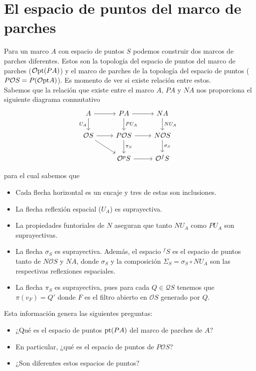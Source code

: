 \section{El espacio de puntos del marco de parches}

Para un marco $A$ con espacio de puntos $S$ podemos construir dos marcos de parches diferentes. Estos son la topología del espacio de puntos del marco de parches ($\mathcal{O}\mathrm{pt}(PA)$) y el marco de parches de la topología del espacio de puntos ($P\mathcal{O}S=P(\mathcal{O}\mathrm{pt} A)$). Es momento de ver si existe relación entre estos.\\

Sabemos que la relación que existe entre el marco $A$, $PA$ y $NA$ nos proporciona el siguiente diagrama conmutativo
\[\begin{tikzcd}
	A & PA & NA \\
	{\mathcal{O}S} & {P\mathcal{O}S} & {N\mathcal{O}S} \\
	& {\mathcal{O}^pS} & {\mathcal{O}^fS}
	\arrow[from=1-1, to=1-2]
	\arrow["{U_A}"', from=1-1, to=2-1]
	\arrow[from=1-2, to=1-3]
	\arrow["{PU_A}", from=1-2, to=2-2]
	\arrow["{NU_A}", from=1-3, to=2-3]
	\arrow[from=2-1, to=2-2]
	\arrow[from=2-1, to=3-2]
	\arrow[from=2-2, to=2-3]
	\arrow["{\pi_S}", from=2-2, to=3-2]
	\arrow["{\sigma_S}", from=2-3, to=3-3]
	\arrow[from=3-2, to=3-3]
\end{tikzcd}\]

para el cual sabemos que
\begin{itemize}
    \item Cada flecha horizontal es un encaje y tres de estas son inclusiones.
    \item La flecha reflexión espacial ($U_A$) es suprayectiva.
    \item La propiedades funtoriales de $N$ aseguran que tanto $NU_A$ como $PU_A$ son suprayectivas.
    \item La flecha $\sigma_S$ es suprayectiva. Además, el espacio $^fS$ es el espacio de puntos tanto de $N\mathcal{O}S$ y $NA$, donde $\sigma_S$ y la composición $\Sigma_S=\sigma_S\circ NU_A$ son las respectivas reflexiones espaciales.
    \item La flecha $\pi_S$ es suprayectiva, pues para cada $Q\in \mathcal{Q}S$ tenemos que $\pi(v_F)=Q'$ donde $F$ es el filtro abierto en $\mathcal{O}S$ generado por $Q$.
\end{itemize}

Esta información genera las siguientes preguntas:
\begin{itemize}
    \item ¿Qué es el espacio de puntos $\mathrm{pt} (PA)$ del marco de parches de $A$?
    \item En particular, ¿qué es el espacio de puntos de $P\mathcal{O}S$?
    \item ¿Son diferentes estos espacios de puntos?
\end{itemize}



